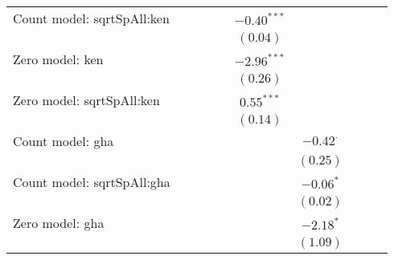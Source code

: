 \begin{table}
\begin{center}
{\begin{tabular}{l c c c c c c c c c}
Count model: sqrtSpAll:ken     &                &                &               &               & $-0.40^{***}$ &                 &               &               &                 \\
                               &                &                &               &               & $(0.04)$      &                 &               &               &                 \\
Zero model: ken                &                &                &               &               & $-2.96^{***}$ &                 &               &               &                 \\
                               &                &                &               &               & $(0.26)$      &                 &               &               &                 \\
Zero model: sqrtSpAll:ken      &                &                &               &               & $0.55^{***}$  &                 &               &               &                 \\
                               &                &                &               &               & $(0.14)$      &                 &               &               &                 \\
Count model: gha               &                &                &               &               &               & $-0.42^{\cdot}$ &               &               &                 \\
                               &                &                &               &               &               & $(0.25)$        &               &               &                 \\
Count model: sqrtSpAll:gha     &                &                &               &               &               & $-0.06^{*}$     &               &               &                 \\
                               &                &                &               &               &               & $(0.02)$        &               &               &                 \\
Zero model: gha                &                &                &               &               &               & $-2.18^{*}$     &               &               &                 \\
                               &                &                &               &               &               & $(1.09)$        &               &               &                 \\

\end{tabular}}
\end{center}
\end{table}
